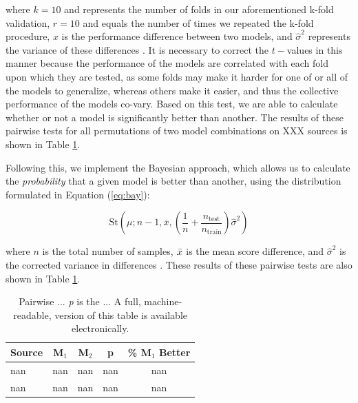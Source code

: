 \documentclass[fleqn,usenatbib]{mnras}
\begin{document}
\noindent where $k=10$ and represents the number of folds in our aforementioned k-fold validation, $r=10$ and equals the number of times we repeated the k-fold procedure, $x$ is the performance difference between two models, and $\hat{\sigma}^2$
represents the variance of these differences \citep{scikit-learn}. It is necessary to correct the $t-$values in this manner because the performance of the models are correlated with each fold upon which they are tested, as some folds may make it harder for one of or all of the models to generalize, whereas others make it easier, and thus the collective performance of the models co-vary. Based on this test, we are able to calculate whether or not a model is significantly better than another. The results of these pairwise tests for all permutations of two model combinations on XXX sources is shown in Table \ref{tab:pairwise}. 

Following this, we implement the Bayesian \cite{benavoli} approach, which allows us to calculate the \textit{probability} that a given model is better than another, using the distribution formulated in Equation (\ref{eq:bay}): 


\begin{equation}\label{eq:bay}
    \mathrm{St}(\mu;n-1,\overline{x},(\frac{1}{n}+\frac{n_{\mathrm{test}}}{n_{\mathrm{train}}}) %
\hat{\sigma}^2)
\end{equation}

\noindent where $n$ is the total number of samples, $\Bar{x}$ is the mean score difference, and $\hat{\sigma}^2$ is the \cite{nadeau_and_bengio} corrected variance in differences \citep{scikit-learn}. These results of these pairwise tests are also shown in Table \ref{tab:pairwise}. 

\begin{table}
    \caption{Pairwise ... \textit{p} is the ...  A full, machine-readable, version of this table is available electronically.}
    \label{tab:pairwise}
    \centering
    \begin{tabular}{l c c c c}
    \hline
    \hline 
    Source & M$_1$ & M$_2$ & p & \% M$_1$ Better  \\
    \hline 
    nan & nan & nan & nan & nan \\ 
    nan & nan & nan & nan & nan \\ 
    \hline 
    \end{tabular}
    
\end{table}
\end{document}
